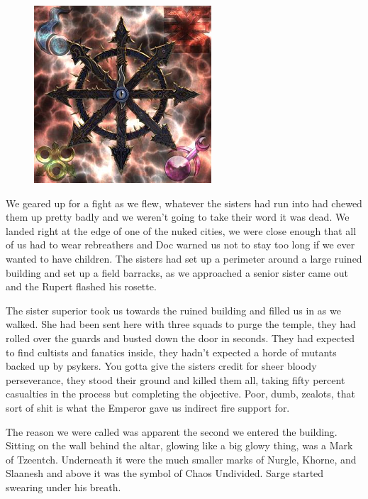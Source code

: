 \begin{figure}
	\begin{center}
		\includegraphics[width=\figwidth]{pics/6/7.png}
	\end{center}
\end{figure}
We geared up for a fight as we flew, whatever the sisters had run into had chewed them up pretty badly and we weren't going to take their word it was dead. 
We landed right at the edge of one of the nuked cities, we were close enough that all of us had to wear rebreathers and Doc warned us not to stay too long if we ever wanted to have children. 
The sisters had set up a perimeter around a large ruined building and set up a field barracks, as we approached a senior sister came out and the Rupert flashed his rosette.

The sister superior took us towards the ruined building and filled us in as we walked. 
She had been sent here with three squads to purge the temple, they had rolled over the guards and busted down the door in seconds.
They had expected to find cultists and fanatics inside, they hadn't expected a horde of mutants backed up by psykers. 
You gotta give the sisters credit for sheer bloody perseverance, they stood their ground and killed them all, taking fifty percent casualties in the process but completing the objective. 
Poor, dumb, zealots, that sort of shit is what the Emperor gave us indirect fire support for.

The reason we were called was apparent the second we entered the building. 
Sitting on the wall behind the altar, glowing like a big glowy thing, was a Mark of Tzeentch. 
Underneath it were the much smaller marks of Nurgle, Khorne, and Slaanesh and above it was the symbol of Chaos Undivided. 
Sarge started swearing under his breath.

